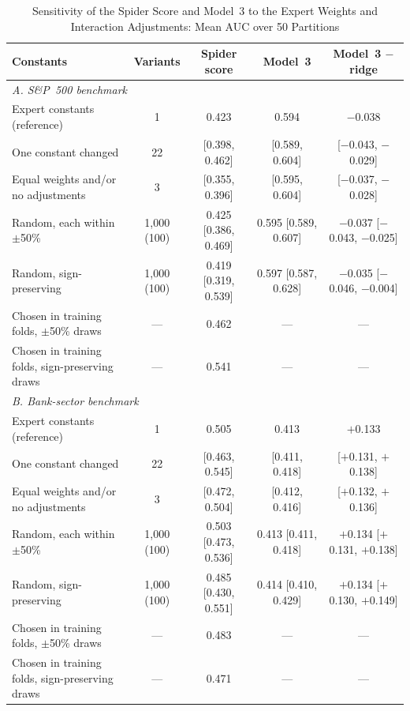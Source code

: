 \begin{table}[!t]
\caption{Sensitivity of the Spider Score and Model~3 to the Expert Weights and Interaction Adjustments: Mean AUC over 50 Partitions}
\label{tab:weights}
\centering
\scriptsize
\begin{tabular*}{\textwidth}{@{\extracolsep{\fill}}lcccc}
\toprule
\textbf{Constants} & \textbf{Variants} & \textbf{Spider score} & \textbf{Model~3} & \textbf{Model~3 $-$ ridge} \\
\midrule
\multicolumn{5}{l}{\textit{A. S\&P~500 benchmark}} \\
Expert constants (reference) & 1 & 0.423 & 0.594 & $-$0.038 \\
One constant changed & 22 & [0.398, 0.462] & [0.589, 0.604] & [$-$0.043, $-$0.029] \\
Equal weights and/or no adjustments & 3 & [0.355, 0.396] & [0.595, 0.604] & [$-$0.037, $-$0.028] \\
Random, each within $\pm$50\% & 1,000 (100) & 0.425 [0.386, 0.469] & 0.595 [0.589, 0.607] & $-$0.037 [$-$0.043, $-$0.025] \\
Random, sign-preserving & 1,000 (100) & 0.419 [0.319, 0.539] & 0.597 [0.587, 0.628] & $-$0.035 [$-$0.046, $-$0.004] \\
Chosen in training folds, $\pm$50\% draws & --- & 0.462 & --- & --- \\
Chosen in training folds, sign-preserving draws & --- & 0.541 & --- & --- \\
\midrule
\multicolumn{5}{l}{\textit{B. Bank-sector benchmark}} \\
Expert constants (reference) & 1 & 0.505 & 0.413 & $+$0.133 \\
One constant changed & 22 & [0.463, 0.545] & [0.411, 0.418] & [$+$0.131, $+$0.138] \\
Equal weights and/or no adjustments & 3 & [0.472, 0.504] & [0.412, 0.416] & [$+$0.132, $+$0.136] \\
Random, each within $\pm$50\% & 1,000 (100) & 0.503 [0.473, 0.536] & 0.413 [0.411, 0.418] & $+$0.134 [$+$0.131, $+$0.138] \\
Random, sign-preserving & 1,000 (100) & 0.485 [0.430, 0.551] & 0.414 [0.410, 0.429] & $+$0.134 [$+$0.130, $+$0.149] \\
Chosen in training folds, $\pm$50\% draws & --- & 0.483 & --- & --- \\
Chosen in training folds, sign-preserving draws & --- & 0.471 & --- & --- \\
\bottomrule
\end{tabular*}

\end{table}
